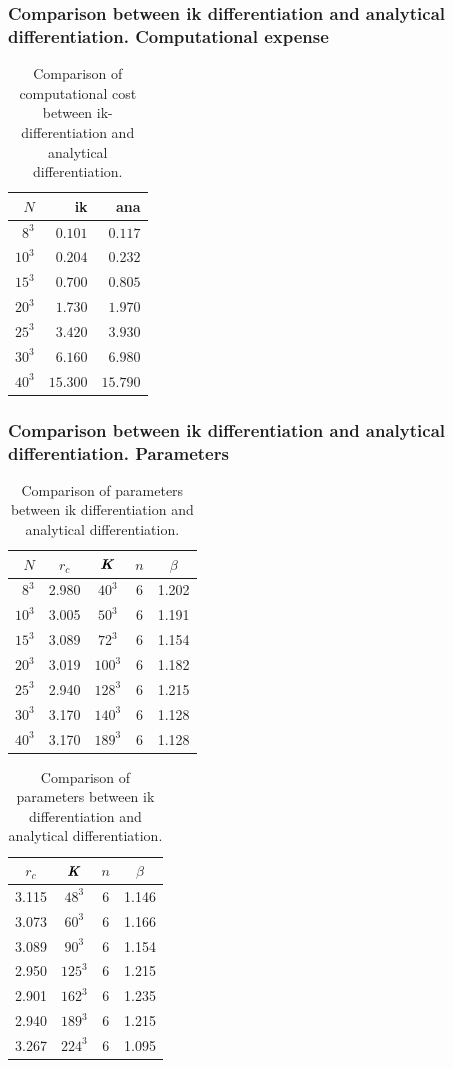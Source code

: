 \documentclass{beamer}
\renewcommand{\v}[1]{\textbf{\textit{#1}}}
\begin{document}
\begin{frame}
  \frametitle{Comparison between ik differentiation and analytical differentiation. Computational expense}
\begin{table}
  \centering
  \begin{tabular}{r|r|r}
    $N$    & ik & ana \\ \hline
    $8^3$ & $0.101$  &$0.117$ \\
    $10^3$ & $0.204$ &$0.232$ \\
    $15^3$ & $0.700$ &$0.805$ \\
    $20^3$ & $1.730$ &$1.970$  \\
    $25^3$ & $3.420$ &$3.930$ \\
    $30^3$ & $6.160$ &$6.980$  \\
    $40^3$ & $15.300$  &$15.790$ 
  \end{tabular}
  \caption{
    Comparison of computational cost between ik-differentiation and analytical differentiation.
  }
\end{table}
\end{frame}


\begin{frame}
  \frametitle{Comparison between ik differentiation and analytical differentiation. Parameters}
\begin{table}
  \centering
  \begin{tabular}{r|c|c|c|c}
    $N$    & $r_c$ & $\v K$ & $n$& $\beta$\\ \hline
    $8^3$ & 2.980 & $40^3$ & 6 & 1.202 \\
    $10^3$ & 3.005 & $50^3$ & 6 & 1.191  \\
    $15^3$ & 3.089 & $72^3$ & 6 & 1.154  \\
    $20^3$ & 3.019 & $100^3$ & 6 & 1.182  \\
    $25^3$ & 2.940 & $128^3$ & 6 & 1.215 \\
    $30^3$ & 3.170 & $140^3$ & 6 & 1.128  \\
    $40^3$ & 3.170 & $189^3$ & 6 & 1.128  
  \end{tabular}
  \hfill
  \begin{tabular}{c|c|c|c}
     $r_c$ & $\v K$ & $n$& $\beta$  \\ \hline
     3.115 & $48^3$ & 6 & 1.146  \\
     3.073 & $60^3$ & 6 & 1.166  \\
     3.089 & $90^3$ & 6 & 1.154  \\
     2.950 & $125^3$ & 6 & 1.215  \\
     2.901 & $162^3$ & 6 & 1.235  \\
     2.940 & $189^3$ & 6 & 1.215  \\
     3.267 & $224^3$ & 6 & 1.095 
  \end{tabular}
  \caption{
    Comparison of parameters between ik differentiation and analytical differentiation.
  }
\end{table}
\end{frame}
\end{document}
